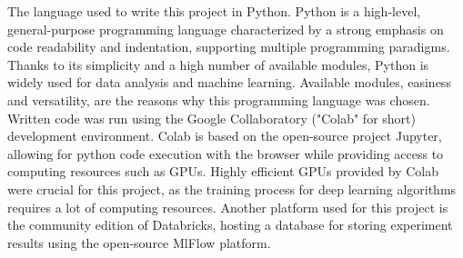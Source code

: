 \documentclass[a4paper,twoside,12pt]{book}
\begin{document}
The language used to write this project in Python. Python is a high-level, general-purpose programming language characterized by a strong emphasis on code readability and indentation, supporting multiple programming paradigms. Thanks to its simplicity and a high number of available modules, Python is widely used for data analysis and machine learning. Available modules, easiness and versatility, are the reasons why this programming language was chosen. Written code was run using the Google Collaboratory ("Colab" for short) development environment. Colab is based on the open-source project Jupyter, allowing for python code execution with the browser while providing access to computing resources such as GPUs. Highly efficient GPUs provided by Colab were crucial for this project, as the training process for deep learning algorithms requires a lot of computing resources. Another platform used for this project is the community edition of Databricks, hosting a database for storing experiment results using the open-source MlFlow platform.
\end{document}
